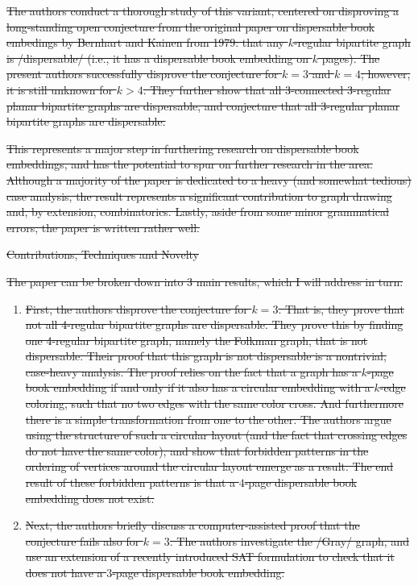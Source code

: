 \documentclass{article}
\begin{document}
\begin{itemize}
{\st{The authors conduct a thorough study of this variant, centered on disproving a long-standing open conjecture from the original paper on dispersable book embedings by Bernhart and Kainen from 1979: that any $k$-regular bipartite graph is /dispersable/ (i.e., it has a dispersable book embedding on $k$ pages). The present authors successfully disprove the conjecture for $k=3$ and $k=4$; however, it is still unknown for $k>4$. They further show that all 3-connected 3-regular planar bipartite graphs are dispersable, and conjecture that all 3-regular planar bipartite graphs are dispersable.}

\st{This represents a major step in furthering research on dispersable book embeddings, and has the potential to spur on further research in the area. Although a majority of the paper is dedicated to a heavy (and somewhat tedious) case analysis, the result represents a significant contribution to graph drawing and, by extension, combinatorics. Lastly, aside from some minor grammatical errors, the paper is written rather well.}


\st{Contributions, Techniques and Novelty}

\st{The paper can be broken down into 3 main results, which I will address in turn:}

\begin{enumerate}

\item \st{First, the authors disprove the conjecture for $k=3$. That is, they prove that not all 4-regular bipartite graphs are dispersable. They prove this by finding one 4-regular bipartite graph, namely the Folkman graph, that is not dispersable. Their proof that this graph is not dispersable is a nontrivial, case-heavy analysis. The proof relies on the fact that a graph has a $k$-page book embedding if and only if it also has a circular embedding with a $k$-edge coloring, such that no two edges with the same color cross. And furthermore there is a simple transformation from one to the other. The authors argue using the structure of such a circular layout (and the fact that crossing edges do not have the same color), and show that forbidden patterns in the ordering of vertices around the circular layout emerge as a result. The end result of these forbidden patterns is that a $4$-page dispersable book embedding does not exist.}

\item \st{Next, the authors briefly discuss a computer-assisted proof that the conjecture fails also for $k=3$. The authors investigate the /Gray/ graph, and use an extension of a recently introduced SAT formulation to check that it does not have a $3$-page dispersable book embedding.}


\end{enumerate}}
\end{itemize}
\end{document}

